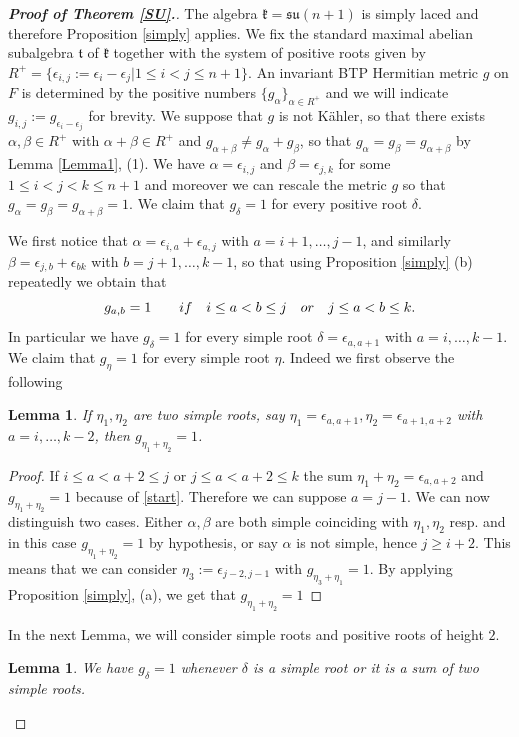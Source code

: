 \documentclass{amsart}
\numberwithin{equation}{section}
\newtheorem{lemma}  [theorem]     {Lemma}
\theoremstyle{definition}
\renewcommand{\1}{\mathds{1}}
\renewcommand{\a}{\alpha}
\renewcommand{\b}{\beta}
\newcommand{\eps}{\epsilon}
\newcommand{\gk}{\mathfrak k}
\newcommand{\gt}{\mathfrak t}
\newcommand{\su}{\mathfrak{su}}
\renewcommand{\>}{\rightarrow}
\begin{document}
\begin{proof}[{\bf{Proof of Theorem \ref{SU}.}}] The algebra $\gk= \su(n+1)$ is simply laced and therefore Proposition \ref{simply} applies. We fix the standard maximal abelian subalgebra $\gt$ of $\gk$ together with the system of positive roots given by $R^+ = \{\eps_{i,j}:=\epsilon_i-\epsilon_j| 1\leq i<j\leq n+1\}$. An invariant {\rm BTP} Hermitian metric $g$ on $F$ is determined by the positive numbers $\{g_\a\}_{\a\in R^+}$ and we will indicate $g_{i,j}:=g_{\eps_i-\eps_j}$ for brevity. We suppose that $g$ is not K\"ahler, so that there exists $\a,\b\in R^+$
with $\a+\b\in R^+$ and $g_{\a+\b}\neq g_\a+g_\b$, so that $g_\a=g_\b=g_{\a+\b}$ by Lemma \ref{Lemma1}, (1). We have $\a=\eps_{i,j}$ and $\b=\eps_{j,k}$ for some $1\leq i<j<k\leq n+1$ and moreover we can rescale the metric $g$ so that $g_\a=g_\b=g_{\a+\b}=1$. We claim that $g_\delta=1$ for every positive root $\delta$.\par
We first notice that $\a=\eps_{i,a}+\eps_{a,j}$ with $a=i+1,\ldots,j-1$, and similarly $\b=\eps_{j,b}+\eps_{bk}$ with $b=j+1,\ldots,k-1$, so that using Proposition \ref{simply} (b) repeatedly we obtain that
\begin{equation} \label{start}g_{a,b}= 1\qquad {\rm{if}}\quad i\leq a<b\leq j\quad {\rm {or}}\quad j\leq a<b\leq k.\end{equation}
In particular we have $g_\delta=1$ for every simple root $\delta=\eps_{a,a+1}$ with $a=i,\ldots,k-1$. We claim that $g_\eta=1$ for every simple root $\eta$. Indeed we first observe the following
\begin{lemma}\label{simpleroots} If $\eta_1,\eta_2$ are two simple roots, say $\eta_1=\eps_{a,a+1},\eta_2=\eps_{a+1,a+2}$ with $a=i,\ldots,k-2$, then $g_{\eta_1+\eta_2}=1$.
\end{lemma}
\begin{proof} If $i\leq a<a+2\leq j$ or $j\leq a<a+2\leq k$ the sum $\eta_1+\eta_2=\eps_{a,a+2}$ and $g_{\eta_1+\eta_2}=1$ because of \eqref{start}. Therefore we can suppose
$a=j-1$. We can now distinguish two cases. Either $\a,\b$ are both simple coinciding with $\eta_1,\eta_2$ resp. and in this case $g_{\eta_1+\eta_2}=1$ by hypothesis, or say $\a$ is not simple, hence $j\geq i+2$. This means that we can consider $\eta_3:= \eps_{j-2,j-1}$ with $g_{\eta_3+\eta_1}=1$. By applying Proposition \ref{simply}, (a), we get that
$g_{\eta_1+\eta_2}=1$\end{proof}
In the next Lemma, we will consider simple roots and positive roots of height $2$.
\begin{lemma}\label{height} We have $g_\delta=1$ whenever $\delta$ is a simple root or it is a sum of two simple roots.

\end{lemma}
\end{proof}
\end{document}
